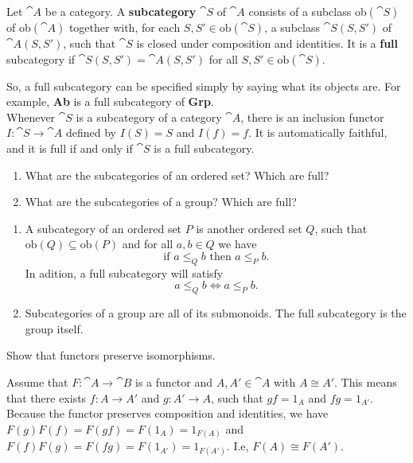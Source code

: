 \begin{definition}
    Let $\cat{A}$ be a category. A \textbf{subcategory} $\cat{S}$ of $\cat{A}$ consists of a subclass ob$(\cat{S})$ of ob$(\cat{A})$ together with, for each $S,S' \in \text{ob}(\cat{S})$, a subclass $\cat{S}(S,S')$ of $\cat{A}(S,S')$, such that $\cat{S}$ is closed under composition and identities. It is a \textbf{full} subcategory if $\cat{S}(S,S')=\cat{A}(S,S')$ for all $S,S'\in \text{ob}(\cat{S})$.
\end{definition}
So, a full subcategory can be specified simply by saying what its objects are. For example, \textbf{Ab} is a full subcategory of \textbf{Grp}.\\
Whenever $\cat{S}$ is a subcategory of a category $\cat{A}$, there is an inclusion functor $I:\cat{S}\to \cat{A}$ defined by $I(S)=S$ and $I(f)=f$. It is automatically faithful, and it is full if and only if $\cat{S}$ is a full subcategory.

\begin{exercise}
    \begin{enumerate}[label=(\alph*)]
        \item What are the subcategories of an ordered set? Which are full?
        \item What are the subcategories of a group? Which are full?
    \end{enumerate}
\end{exercise}
\begin{solution}\leavevmode
    \begin{enumerate}[label=(\alph*)]
        \item A subcategory of an ordered set $P$ is another ordered set $Q$, such that\\ $\text{ob}(Q) \subseteq \text{ob}(P)$ and for all $a,b\in Q$ we have
        $$\text{if } a \leq_Q b \text{ then } a \leq_P b.$$
        In adition, a full subcategory will satisfy
        $$a \leq_Q b \Longleftrightarrow a \leq_P b.$$
        \item Subcategories of a group are all of its submonoids. The full subcategory is the group itself.
    \end{enumerate}
\end{solution}

\begin{exercise}
    Show that functors preserve isomorphisms.
\end{exercise}
\begin{solution}
    Assume that $F: \cat{A}\to \cat{B}$ is a functor and $A,A'\in \cat{A}$ with $A\cong A'$. This means that there exists $f: A\to A'$ and $g: A'\to A$, such that $gf = 1_A$ and $fg = 1_{A'}$. Because the functor preserves composition and identities, we have $F(g)F(f) = F(gf) = F(1_A) = 1_{F(A)}$ and $F(f)F(g) = F(fg) = F(1_{A'}) = 1_{F(A')}$. I.e, $F(A)\cong F(A')$.
\end{solution}

